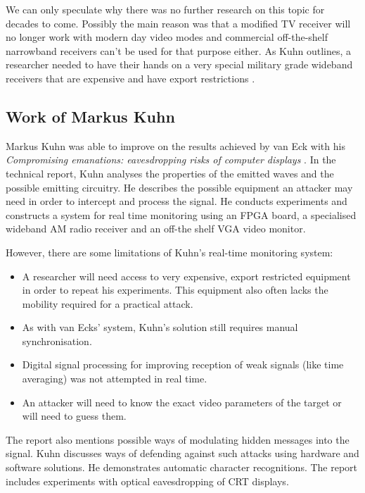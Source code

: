 \documentclass[a4paper,12pt,twoside,openright]{report}
\begin{document}
We can only speculate why there was no further research on this topic for decades to come. Possibly the main reason was that a modified TV receiver will no longer work with modern day video modes and commercial off-the-shelf narrowband receivers can't be used for that purpose either. As Kuhn outlines, a researcher needed to have their hands on a very special military grade wideband receivers that are expensive and have export restrictions \cite{kuhn2003compromising}.
 
\subsection{Work of Markus Kuhn}

Markus Kuhn was able to improve on the results achieved by van Eck with his \textit{Compromising emanations: eavesdropping risks of computer displays} \cite{kuhn2003compromising}. In the technical report, Kuhn analyses the properties of the emitted waves and the possible emitting circuitry. He describes the possible equipment an attacker may need in order to intercept and process the signal. He conducts experiments and constructs a system for real time monitoring using an FPGA board, a specialised wideband AM radio receiver and an off-the shelf VGA video monitor. 

However, there are some limitations of Kuhn's real-time monitoring system:

\begin{itemize}

  \item A researcher will need access to very expensive, export restricted equipment in order to repeat his experiments. This equipment also often lacks the mobility required for a practical attack.
  \item As with van Ecks' system, Kuhn's solution still requires manual synchronisation.
  \item Digital signal processing for improving reception of weak signals (like time averaging) was not attempted in real time.
  \item An attacker will need to know the exact video parameters of the target or will need to guess them.

\end{itemize}

The report also mentions possible ways of modulating hidden messages into the signal. Kuhn discusses ways of defending against such attacks using hardware and software solutions. He demonstrates automatic character recognitions. The report includes experiments with optical eavesdropping of CRT displays.
\end{document}
